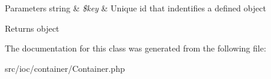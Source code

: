 \begin{DoxyParams}[1]{Parameters}
string & {\em \$key} & Unique id that indentifies a defined object \\
\hline
\end{DoxyParams}
\begin{DoxyReturn}{Returns}
object 
\end{DoxyReturn}


The documentation for this class was generated from the following file\-:\begin{DoxyCompactItemize}
\item 
src/ioc/container/Container.\-php\end{DoxyCompactItemize}
